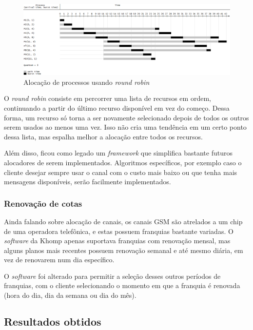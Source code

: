 \documentclass[12pt]{article}
\begin{document}
\vspace*{1em}
\begin{figure}[ht]
    \centering
    \includegraphics[width=\textwidth]{roundrobin.png}
    \caption{Alocação de processos usando \textit{round robin}}
    \label{fig:rr}
\end{figure}
\vspace*{1em}

O \textit{round robin} consiste em percorrer uma lista de recursos em ordem,
continuando a partir do último recurso disponível em vez do começo. Dessa
forma, um recurso só torna a ser novamente selecionado depois de todos os
outros serem usados ao menos uma vez. Isso não cria uma tendência em um certo
ponto dessa lista, mas espalha melhor a alocação entre todos os recursos.

Além disso, ficou como legado um \textit{framework} que simplifica bastante
futuros alocadores de serem implementados. Algoritmos específicos, por exemplo
caso o cliente desejar sempre usar o canal com o custo mais baixo ou que tenha
mais mensagens disponíveis, serão facilmente implementados.

\subsubsection{Renovação de cotas}

Ainda falando sobre alocação de canais, os canais GSM são atrelados a um chip
de uma operadora telefônica, e estas possuem franquias bastante variadas. O
\textit{software} da Khomp apenas suportava franquias com renovação mensal, mas
alguns planos mais recentes possuem renovação semanal e até mesmo diária, em
vez de renovarem num dia específico.

O \textit{software} foi alterado para permitir a seleção desses outros períodos
de franquias, com o cliente selecionando o momento em que a franquia é renovada
(hora do dia, dia da semana ou dia do mês).

\subsection{Resultados obtidos}
\end{document}

